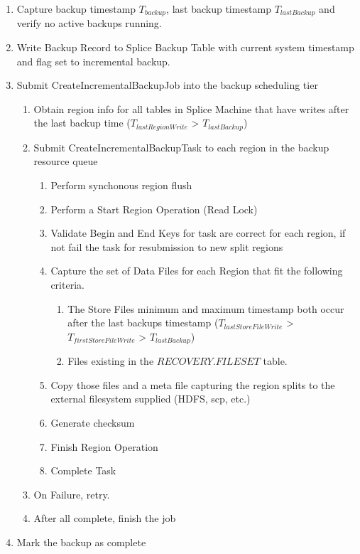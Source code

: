 \begin{enumerate}
	\item Capture backup timestamp $T_{backup}$, last backup timestamp
	$T_{lastBackup}$ and verify no active backups running.
	\item Write Backup Record to Splice Backup Table with current system timestamp
	and flag set to incremental backup.
	\item Submit CreateIncrementalBackupJob into the backup scheduling tier
	\begin{enumerate}
	\item Obtain region info for all tables in Splice Machine that have writes
	after the last backup time ($T_{lastRegionWrite}$ > $T_{lastBackup}$)
	\item Submit CreateIncrementalBackupTask to each region in the backup resource
	queue
	\begin{enumerate}
	\item Perform synchonous region flush 
	\item Perform a Start Region Operation (Read Lock)
	\item Validate Begin and End Keys for task are correct for each region, if not
	fail the task for resubmission to new split regions
	\item Capture the set of Data Files for each Region that fit the following
	criteria.
	\begin{enumerate}
	\item The Store Files minimum and maximum timestamp both occur after the last
	backups timestamp ($T_{lastStoreFileWrite}$ > $T_{firstStoreFileWrite}$ >
	$T_{lastBackup}$)
	\item Files existing in the $RECOVERY.FILESET$ table.
	\end{enumerate}
	\item Copy those files and a meta file capturing the region splits to the
	external filesystem supplied (HDFS, scp, etc.)
	\item Generate checksum
	\item Finish Region Operation
	\item Complete Task
	\end{enumerate}
	\item On Failure, retry.
	\item After all complete, finish the job
	\end{enumerate}
	\item Mark the backup as complete
\end{enumerate}


